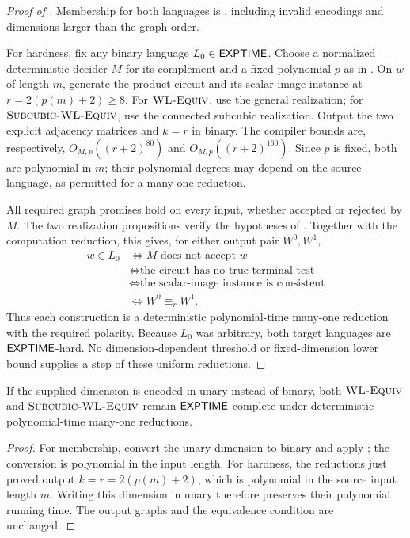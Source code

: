 \begin{proof}[Proof of ]
Membership for both languages is , including
invalid encodings and dimensions larger than the graph order.

For hardness, fix any binary language \(L_0\in\mathsf{EXPTIME}\).
Choose a normalized deterministic decider \(M\) for its complement
and a fixed polynomial \(p\) as in .
On \(w\) of length \(m\), generate the product circuit and its
scalar-image instance at \(r=2(p(m)+2)\ge8\). For \(\textnormal{\textsc{WL-Equiv}}\), use
the general realization; for \(\textnormal{\textsc{Subcubic-WL-Equiv}}\), use the connected subcubic
realization. Output the two explicit adjacency matrices and \(k=r\)
in binary. The compiler bounds are, respectively,
\(O_{M,p}((r+2)^{80})\) and \(O_{M,p}((r+2)^{160})\).
Since \(p\) is fixed, both are polynomial in \(m\); their polynomial
degrees may depend on the source language, as permitted for a
many-one reduction.

All required graph promises hold on every input, whether accepted
or rejected by \(M\). The two realization propositions verify the
hypotheses of . Together with the computation
reduction, this gives, for either output pair \(W^0,W^1\),
\[
\begin{aligned}
 w\in L_0
 &\Longleftrightarrow M\text{ does not accept }w\\
 &\Longleftrightarrow \text{the circuit has no true terminal test}\\
 &\Longleftrightarrow \text{the scalar-image instance is consistent}\\
 &\Longleftrightarrow W^0\equiv_r W^1.
\end{aligned}
\]
Thus each construction is a deterministic polynomial-time many-one
reduction with the required polarity. Because \(L_0\) was arbitrary,
both target languages are \(\mathsf{EXPTIME}\)-hard. No dimension-dependent
threshold or fixed-dimension lower bound supplies a step of these
uniform reductions.
\end{proof}


\begin{corollary}\label{cor:unary-dimension}
If the supplied dimension is encoded in unary instead of binary,
both \(\textnormal{\textsc{WL-Equiv}}\) and \(\textnormal{\textsc{Subcubic-WL-Equiv}}\) remain \(\mathsf{EXPTIME}\)-complete under
deterministic polynomial-time many-one reductions.
\end{corollary}

\begin{proof}
For membership, convert the unary dimension to binary and apply
; the conversion is polynomial in the input length.
For hardness, the reductions just proved output
\(k=r=2(p(m)+2)\), which is polynomial in the source input length \(m\).
Writing this dimension in unary therefore preserves their polynomial
running time. The output graphs and the equivalence condition are
unchanged.
\end{proof}
